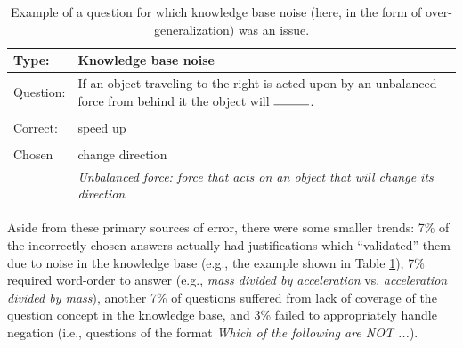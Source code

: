 \begin{table}[t]
\begin{center}
\begin{tabular}{p{2cm}p{12cm}}
\hline
Type: & \textbf{Knowledge base noise}\\
\hline
Question: & If an object traveling to the right is acted upon by an unbalanced force from behind it the object will $\rule{1cm}{0.15mm}$.\\
\\
Correct: & speed up\\
\\
Chosen & change direction 	\\
			& \textit{ Unbalanced force: force that acts on an object that will change its direction}	\\
\end{tabular}
\caption{{ Example of a question for which knowledge base noise (here, in the form of over-generalization) was an issue.}} 
\label{tab:ex_noise}
\end{center}
\end{table}


Aside from these primary sources of error, there were some smaller trends:  
7\% of the incorrectly chosen answers actually had justifications which ``validated'' them due to noise in the knowledge base (e.g., the example shown in Table \ref{tab:ex_noise}), 7\% required word-order to answer (e.g., \emph{mass divided by acceleration} vs. \emph{acceleration divided by mass}), another 7\% of questions suffered from lack of coverage of the question concept in the knowledge base,
 and 3\% failed to appropriately handle negation (i.e., questions of the format \emph{Which of the following are NOT ...}). 

%
%


